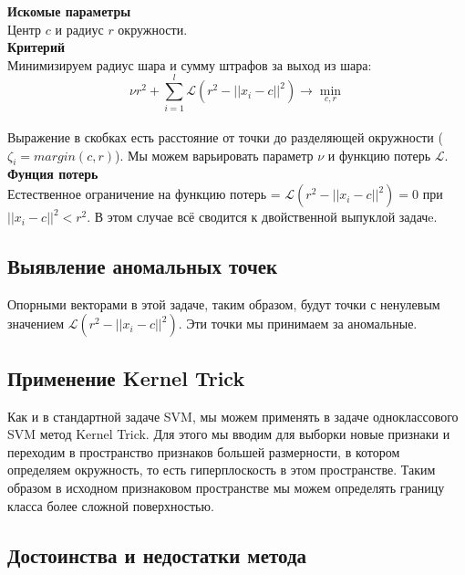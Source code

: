 \textbf{Искомые параметры} \\

Центр $c$ и радиус $r$ окружности. \\

\textbf{Критерий} \\

Минимизируем радиус шара и сумму штрафов за выход из шара:\\

\[ \nu r^2 + \sum_{i = 1}^l \mathcal{L} (r^2 - ||x_i - c||^2) \longrightarrow \min_{c, r}\] \\

Выражение в скобках есть расстояние от точки до разделяющей окружности ($\zeta_i = margin(c,r)$). Мы можем варьировать параметр $\nu$ и функцию потерь $\mathcal{L}$. \\

\textbf{Фунция потерь} \\

Естественное ограничение на функцию потерь = $\mathcal{L} (r^2 - ||x_i - c||^2) = 0$ при $||x_i - c||^2 < r^2$. В этом случае всё сводится к двойственной выпуклой задачe.

\subsection{Выявление аномальных точек}

Опорными векторами в этой задаче, таким образом, будут точки с ненулевым значением $\mathcal{L} (r^2 - ||x_i - c||^2)$. Эти точки мы принимаем за аномальные. \\

\subsection{Применение Kernel Trick}

Как и в стандартной задаче SVM, мы можем применять в задаче одноклассового SVM метод Kernel Trick. Для этого мы вводим для выборки новые признаки и переходим в пространство признаков большей размерности, в котором определяем окружность, то есть гиперплоскость в этом пространстве. Таким образом в исходном признаковом пространстве мы можем определять границу класса более сложной поверхностью.

\subsection{Достоинства и недостатки метода}

